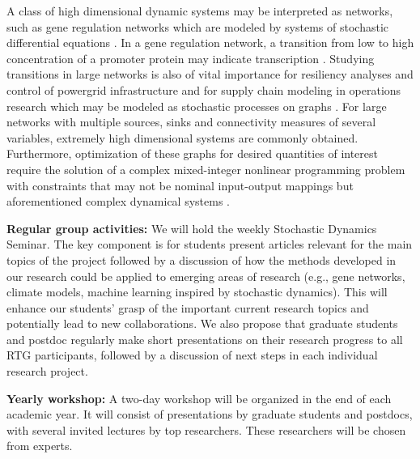 \documentclass[11pt]{NSFamsart}
\begin{document}

A class of high dimensional dynamic systems may be interpreted as networks, such as   gene regulation networks \cite{Raser2005} which are modeled by systems of stochastic differential equations \cite{Suel06}.  In a gene regulation network, a transition from low to high concentration of a promoter protein may indicate transcription \cite{Stefan,ZLDK}. Studying transitions in large networks is also of vital importance for resiliency analyses and control of powergrid infrastructure and for supply chain modeling in operations research which may be modeled as stochastic processes on graphs \cite{shin2020graph,anghel2007stochastic,nardelli2014models}. For large networks with multiple sources, sinks and connectivity measures of several variables, extremely high dimensional systems are commonly obtained. Furthermore, optimization of these graphs for desired quantities of interest require the solution of a complex mixed-integer nonlinear programming problem with constraints that may not be nominal input-output mappings but aforementioned complex dynamical systems \cite{shin2020decentralized,sampat2017optimization,kim2019graph,shin2021exponential}.

 
\noindent \textbf{Regular group activities:} We will hold   the weekly Stochastic Dynamics Seminar. The key component     is for     students present articles relevant for the main topics of the
project followed by a discussion of how the methods developed in our research could be applied to emerging
areas of   research (e.g., gene networks, climate models, machine learning inspired by stochastic dynamics). This will enhance our students’ grasp of the important current research topics
and potentially lead to new collaborations. We also propose that graduate students and postdoc regularly
make short presentations on their research progress to all RTG participants, followed by a discussion of next steps in each individual research project.


 

\noindent \textbf{Yearly workshop:} A two-day workshop will be organized in the end of each academic year.  It will consist   of presentations by graduate
students and postdocs, with several invited lectures 
by top researchers. These researchers will be chosen from experts.   
\end{document}
